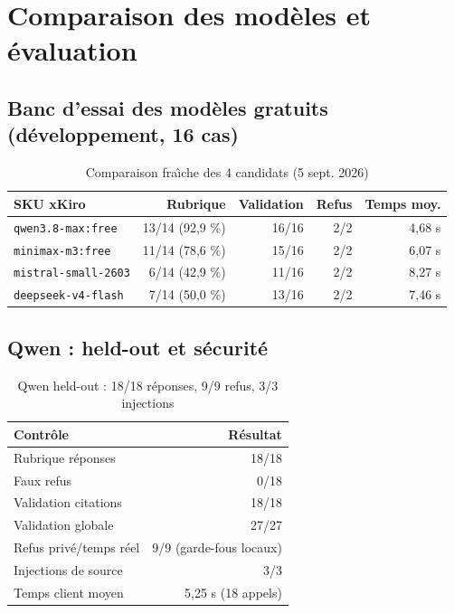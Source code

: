 \documentclass[a4paper,12pt]{report}
\begin{document}
\section{Comparaison des mod\`eles et \'evaluation}
\subsection{Banc d'essai des mod\`eles gratuits (d\'eveloppement, 16 cas)}
\begin{table}[H]
\centering
\begin{tabular}{|l|r|r|r|r|}
\hline
SKU xKiro & Rubrique & Validation & Refus & Temps moy. \\
\hline
\texttt{qwen3.8-max:free} & 13/14 (92,9 \%) & 16/16 & 2/2 & 4,68 s \\
\hline
\texttt{minimax-m3:free} & 11/14 (78,6 \%) & 15/16 & 2/2 & 6,07 s \\
\hline
\texttt{mistral-small-2603} & 6/14 (42,9 \%) & 11/16 & 2/2 & 8,27 s \\
\hline
\texttt{deepseek-v4-flash} & 7/14 (50,0 \%) & 13/16 & 2/2 & 7,46 s \\
\hline
\end{tabular}
\caption{Comparaison fra\^{\i}che des 4 candidats (5 sept. 2026)}
\end{table}

\subsection{Qwen : held-out et s\'ecurit\'e}
\begin{table}[H]
\centering
\begin{tabular}{|l|r|}
\hline
Contr\^ole & R\'esultat \\
\hline
Rubrique r\'eponses & 18/18 \\
\hline
Faux refus & 0/18 \\
\hline
Validation citations & 18/18 \\
\hline
Validation globale & 27/27 \\
\hline
Refus priv\'e/temps r\'eel & 9/9 (garde-fous locaux) \\
\hline
Injections de source & 3/3 \\
\hline
Temps client moyen & 5,25 s (18 appels) \\
\hline
\end{tabular}
\caption{Qwen held-out : 18/18 r\'eponses, 9/9 refus, 3/3 injections}
\end{table}
\end{document}
